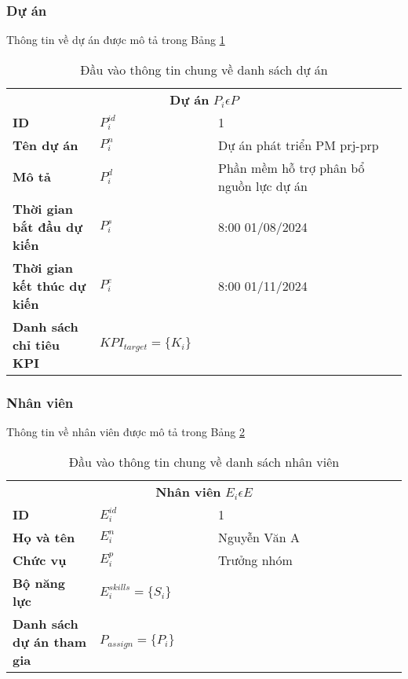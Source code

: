 \documentclass{article}
\begin{document}
\subsubsection{Dự án}   
    Thông tin về dự án được mô tả trong Bảng \ref{tab:table_input_thongtinchung}
        \begin{table} [htbp]
            \caption{Đầu vào thông tin chung về danh sách dự án}
            \centering
            \begin{tabular}{p{0.22\linewidth} p{0.3\linewidth} p{0.53\linewidth}} 
                \toprule
                \multicolumn{3}{c}{\textbf{Dự án} \textit{$P_{i}\epsilon P$}}\\
                \textbf{ID} & $P_i^{id}$ & 1\\ 
                \textbf{Tên dự án} & $P_i^n$ & Dự án phát triển PM prj-prp\\ 
                \textbf{Mô tả} & $P_i^d$ & Phần mềm hỗ trợ phân bổ nguồn lực dự án\\ 
                \textbf{Thời gian bắt đầu dự kiến} & $P_i^s$ & 8:00 01/08/2024\\ 
                \textbf{Thời gian kết thúc dự kiến} & $P_i^e$ & 8:00 01/11/2024\\ 
                \textbf{Danh sách chỉ tiêu KPI} & $KPI_{target} = \{K_i\}$ & \\ 
                \bottomrule             
            \end{tabular}
            \label{tab:table_input_thongtinchung}
        \end{table}
\subsubsection{Nhân viên}
    Thông tin về nhân viên được mô tả trong Bảng \ref{tab:table_input_thongtinnhanvien}
        \begin{table} [htbp]
            \caption{Đầu vào thông tin chung về danh sách nhân viên}
            \centering
            \begin{tabular}{p{0.22\linewidth} p{0.3\linewidth} p{0.53\linewidth}} 
                \toprule
                \multicolumn{3}{c}{\textbf{Nhân viên} \textit{$E_{i}\epsilon E$}}\\
                \textbf{ID} & $E_{i}^{id}$ & 1\\ 
                \textbf{Họ và tên} & $E_{i}^n$ & Nguyễn Văn A\\ 
                \textbf{Chức vụ} & $E_{i}^p$ & Trưởng nhóm\\ 
                \textbf{Bộ năng lực} & $E_{i}^{skills} = \{S_i\}$ & \\
                \textbf{Danh sách dự án tham gia} & $P_{assign} = \{P_i\}$ & \\ 
                \bottomrule             
            \end{tabular}
            \label{tab:table_input_thongtinnhanvien}
        \end{table}
\end{document}
